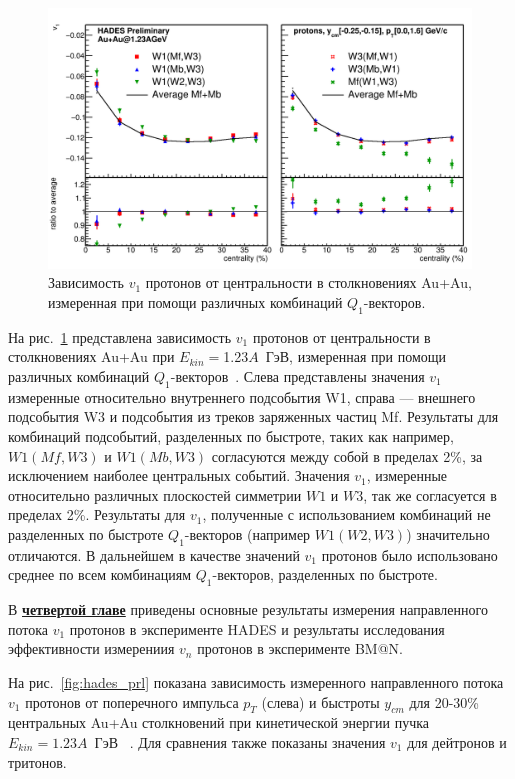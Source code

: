 \begin{figure}[h]
\begin{center}
\includegraphics[width=0.65\linewidth]{images/W1AndW3Nucleus.png}
\caption{Зависимость $v_1$ протонов от центральности  в столкновениях Au+Au,
  измеренная при помощи различных комбинаций $Q_1$-векторов. }
\label{fig:hades_w1w3}
\end{center}
\end{figure}
На рис.~\ref{fig:hades_w1w3} представлена зависимость  $v_1$ протонов от центральности  в столкновениях Au+Au при $E_{kin}=$1.23$A$~ГэВ, измеренная при помощи различных комбинаций $Q_1$-векторов~\cite{Mamaev:2020qom}.
Слева представлены значения $v_1$ измеренные относительно внутреннего подсобытия W1, справа --- внешнего подсобытия W3 и подсобытия из треков заряженных частиц Mf. 
Результаты для комбинаций подсобытий, разделенных по быстроте, таких как например, $W1(Mf,W3)$ и $W1(Mb,W3)$ согласуются между собой в пределах 2\%, за исключением наиболее центральных событий. 
Значения $v_1$, измеренные относительно различных плоскостей симметрии $W1$ и $W3$, так же согласуется в пределах 2\%.
Результаты для $v_1$, полученные с использованием комбинаций не разделенных по быстроте $Q_1$-векторов (например $W1(W2,W3)$) значительно отличаются.
В дальнейшем в качестве значений $v_1$ протонов было использовано среднее по всем комбинациям $Q_1$-векторов, разделенных по быстроте.

В  \underline{\textbf{четвертой главе}} приведены основные результаты измерения направленного потока $v_1$ протонов в  эксперименте HADES и результаты исследования эффективности измерениия $v_n$ протонов в
эксперименте BM@N.

На рис.~\ref{fig:hades_prl} показана зависимость измеренного направленного потока  $v_1$ протонов от поперечного импульса $p_T$ (слева) и быстроты $y_{cm}$ для 20-30\% центральных Au+Au столкновений при кинетической энергии пучка $E_{kin}=1.23A$~ГэВ ~\cite{HADES:2020lob}. 
Для сравнения также показаны значения $v_1$   для дейтронов и тритонов.

